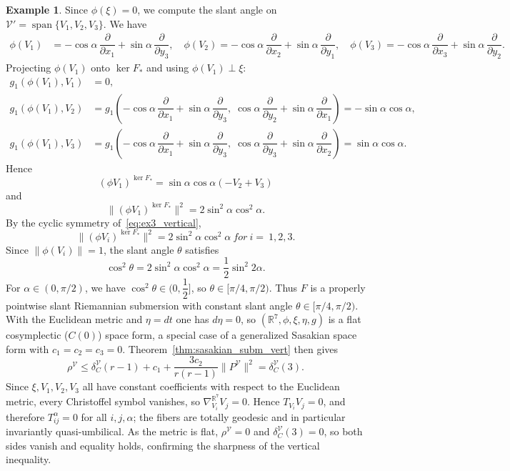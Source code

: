 \documentclass[11pt]{amsart}
\theoremstyle{plain}
\theoremstyle{definition}
\newtheorem{example}{Example}[section]
\theoremstyle{remark}
\DeclareMathOperator{\Span}{span}
\newcommand{\R}{\mathbb{R}}
\newcommand{\calV}{\mathcal{V}}
\begin{document}
\begin{example}
Since $\phi(\xi) = 0$, we compute the slant angle 
on $\calV' = \Span\{V_1, V_2, V_3\}$. We have
\begin{align*}
\phi(V_1) &= 
  -\cos\alpha\,\dfrac{\partial}{\partial x_1} 
  + \sin\alpha\,\dfrac{\partial}{\partial y_3}, \quad
\phi(V_2) = 
  -\cos\alpha\,\dfrac{\partial}{\partial x_2} 
  + \sin\alpha\,\dfrac{\partial}{\partial y_1}, \quad
\phi(V_3) = 
  -\cos\alpha\,\dfrac{\partial}{\partial x_3} 
  + \sin\alpha\,\dfrac{\partial}{\partial y_2}.
\end{align*}
Projecting $\phi(V_1)$ onto $\ker F_*$ 
and using $\phi(V_1) \perp \xi$:
\begin{align*}
g_1(\phi(V_1), V_1) &= 0, \\
g_1(\phi(V_1), V_2) 
&= g_1\!\left(-\cos\alpha\,
  \dfrac{\partial}{\partial x_1} 
  + \sin\alpha\,
  \dfrac{\partial}{\partial y_3},\;
  \cos\alpha\,
  \dfrac{\partial}{\partial y_2} 
  + \sin\alpha\,
  \dfrac{\partial}{\partial x_1}\right) 
= -\sin\alpha\cos\alpha, \\
g_1(\phi(V_1), V_3) 
&= g_1\!\left(-\cos\alpha\,
  \dfrac{\partial}{\partial x_1} 
  + \sin\alpha\,
  \dfrac{\partial}{\partial y_3},\;
  \cos\alpha\,
  \dfrac{\partial}{\partial y_3} 
  + \sin\alpha\,
  \dfrac{\partial}{\partial x_2}\right) 
= \sin\alpha\cos\alpha.
\end{align*}
Hence $$(\phi V_1)^{\ker F_*} 
= \sin\alpha\cos\alpha(-V_2 + V_3)$$ and 
$$\|(\phi V_1)^{\ker F_*}\|^2 
= 2\sin^2\!\alpha\cos^2\!\alpha.$$
By the cyclic symmetry of~\eqref{eq:ex3_vertical}, 
$$\|(\phi V_i)^{\ker F_*}\|^2 
= 2\sin^2\!\alpha\cos^2\!\alpha~ for~ i = ~1,2,3.$$ 
Since $\|\phi(V_i)\| = 1$, the slant angle $\theta$ 
satisfies
\begin{equation}\label{eq:ex3_slant}
\cos^2\theta 
= 2\sin^2\!\alpha\cos^2\!\alpha 
= \dfrac{1}{2}\sin^2\!2\alpha.
\end{equation}
For $\alpha \in (0,\pi/2)$, we have 
$\cos^2\theta \in (0, \dfrac{1}{2}]$, so 
$\theta \in [\pi/4, \pi/2)$. Thus $F$ is a 
{properly} pointwise slant Riemannian 
submersion with constant slant angle 
$\theta \in [\pi/4, \pi/2)$.\\


With the Euclidean metric and $\eta=dt$ one has $d\eta=0$, so
$(\R^7,\phi,\xi,\eta,g)$ is a flat cosymplectic ($C(0)$) space form,
a special case of a generalized Sasakian space form with
$c_1=c_2=c_3=0$. Theorem~\ref{thm:sasakian_subm_vert} then gives
\[
\rho^{\calV} \leq \delta_C^{\calV}(r-1) 
+ c_1 + \dfrac{3c_2}{r(r-1)}\|P^{\calV}\|^2 
= \delta_C^{\calV}(3).
\]
Since $\xi, V_1, V_2, V_3$ all have constant coefficients with respect
to the Euclidean metric, every Christoffel symbol vanishes, so
$\nabla^{\R^7}_{V_i}V_j = 0$. Hence $T_{V_i}V_j = 0$, and therefore
$T_{ij}^\alpha = 0$ for all $i,j,\alpha$; the fibers are totally geodesic
and in particular invariantly quasi-umbilical. As the metric is flat,
$\rho^{\calV} = 0$ and $\delta_C^{\calV}(3) = 0$, so both sides vanish
and equality holds, confirming the sharpness of the vertical inequality.
\end{example}
\end{document}
